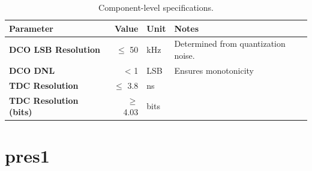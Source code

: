 \documentclass[10pt,a4paper]{article}
\begin{document}
		\scriptsize
		\begin{table}[h!]
			\centering
			\def\arraystretch{1.5}		
			\setlength\arrayrulewidth{0.75pt}
			\setlength{\tabcolsep}{1em} %
			\begin{tabular}{|l|r|l|l|}
				\hline 
				\rule[-1ex]{0pt}{2.5ex} \cellcolor{gray!40}\textbf{Parameter} & \cellcolor{gray!40}\textbf{Value} & \cellcolor{gray!40}\textbf{Unit }& \cellcolor{gray!40}\textbf{Notes}\\ 
				\hline 
				\rule[-1ex]{0pt}{2.5ex} \textbf{DCO LSB Resolution}  & $\leq$ 50  & kHz & Determined from quantization noise.\\ 
				\hline 
				\rule[-1ex]{0pt}{2.5ex} \textbf{DCO DNL} & < 1 & LSB & Ensures monotonicity \\ 
				\hline 
				\rule[-1ex]{0pt}{2.5ex} \textbf{TDC Resolution} & $\leq$ 3.8  & ns & \\ 
				\hline 
				\rule[-1ex]{0pt}{2.5ex} \textbf{TDC Resolution (bits)} & $\geq$ 4.03 &bits & \\ 
				\hline 
			\end{tabular} 
			\caption{Component-level specifications.}
		\end{table}   

	\FloatBarrier

	\section{pres1}
\end{document}
